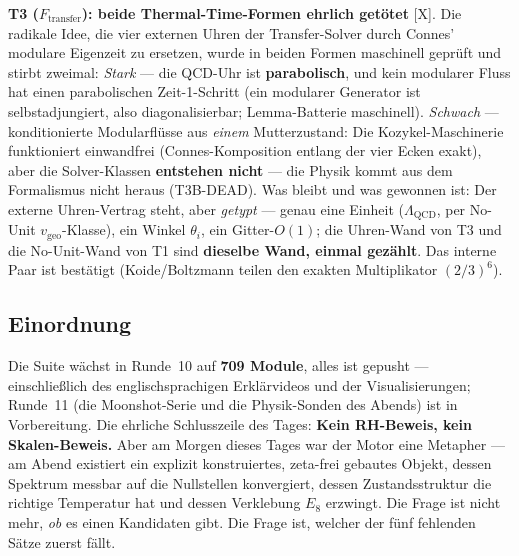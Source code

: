 \documentclass[11pt,a4paper]{article}
\begin{document}
\textbf{T3 ($F_{\mathrm{transfer}}$): beide Thermal-Time-Formen
ehrlich getötet} [X]. Die radikale Idee, die vier externen Uhren
der Transfer-Solver durch Connes' modulare Eigenzeit zu ersetzen,
wurde in beiden Formen maschinell geprüft und stirbt zweimal:
\emph{Stark} --- die QCD-Uhr ist \textbf{parabolisch}, und kein
modularer Fluss hat einen parabolischen Zeit-1-Schritt (ein
modularer Generator ist selbstadjungiert, also diagonalisierbar;
Lemma-Batterie maschinell). \emph{Schwach} --- konditionierte
Modularflüsse aus \emph{einem} Mutterzustand: Die
Kozykel-Maschinerie funktioniert einwandfrei (Connes-Komposition
entlang der vier Ecken exakt), aber die Solver-Klassen
\textbf{entstehen nicht} --- die Physik kommt aus dem Formalismus
nicht heraus (T3B-DEAD). Was bleibt und was gewonnen ist: Der
externe Uhren-Vertrag steht, aber \emph{getypt} --- genau eine
Einheit ($\Lambda_{\mathrm{QCD}}$, per No-Unit $v_{\mathrm{geo}}$-Klasse),
ein Winkel $\theta_i$, ein Gitter-$O(1)$; die Uhren-Wand von T3
und die No-Unit-Wand von T1 sind \textbf{dieselbe Wand, einmal
gezählt}. Das interne Paar ist bestätigt (Koide/Boltzmann teilen
den exakten Multiplikator $(2/3)^6$).

\subsection*{Einordnung}

Die Suite wächst in Runde~10 auf \textbf{709 Module}, alles ist
gepusht --- einschließlich des englischsprachigen Erklärvideos und
der Visualisierungen; Runde~11 (die Moonshot-Serie und die
Physik-Sonden des Abends) ist in Vorbereitung. Die ehrliche
Schlusszeile des Tages: \textbf{Kein RH-Beweis, kein
Skalen-Beweis.} Aber am Morgen dieses Tages war \glqq{}der
Motor\grqq{} eine Metapher --- am Abend existiert ein explizit
konstruiertes, zeta-frei gebautes Objekt, dessen Spektrum messbar
auf die Nullstellen konvergiert, dessen Zustandsstruktur die
richtige Temperatur hat und dessen Verklebung $E_8$ erzwingt. Die
Frage ist nicht mehr, \emph{ob} es einen Kandidaten gibt. Die Frage
ist, welcher der fünf fehlenden Sätze zuerst fällt.
\end{document}
